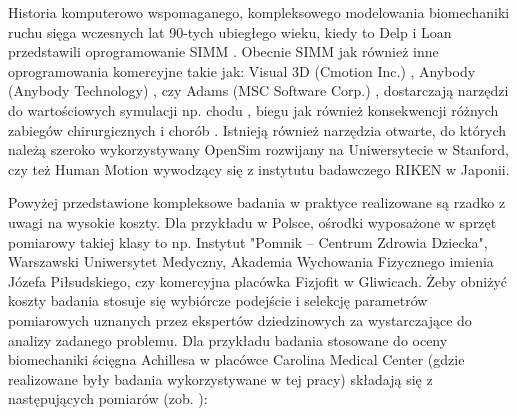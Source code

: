 Historia komputerowo wspomaganego, kompleksowego modelowania biomechaniki ruchu sięga wczesnych lat 90-tych ubiegłego wieku, kiedy to Delp i Loan przedstawili oprogramowanie SIMM \cite{Delp1990}. Obecnie SIMM jak również inne oprogramowania komercyjne takie jak: Visual 3D (Cmotion Inc.) \cite{Visual3D}, Anybody (Anybody Technology) \cite{AnyBody}, czy Adams (MSC Software Corp.) \cite{Adams}, dostarczają narzędzi do wartościowych symulacji np. chodu \cite{Steele2010}, biegu \cite{Hamner2010} jak również konsekwencji różnych zabiegów chirurgicznych \cite{Gomes2013} i chorób \cite{Shao2009}. Istnieją również narzędzia otwarte, do których należą szeroko wykorzystywany OpenSim \cite{Delp2007} rozwijany na Uniwersytecie w Stanford, czy też Human Motion \cite{Riken} wywodzący się z instytutu badawczego RIKEN w Japonii.

Powyżej przedstawione kompleksowe badania w praktyce realizowane są rzadko z uwagi na wysokie koszty. Dla przykładu w Polsce, ośrodki wyposażone w sprzęt pomiarowy takiej klasy to np. Instytut "Pomnik – Centrum Zdrowia Dziecka", Warszawski Uniwersytet Medyczny, Akademia Wychowania Fizycznego imienia Józefa Piłsudskiego, czy komercyjna placówka Fizjofit w Gliwicach. Żeby obniżyć koszty badania stosuje się wybiórcze podejście i selekcję parametrów pomiarowych uznanych przez ekspertów dziedzinowych za wystarczające do analizy zadanego problemu. Dla przykładu badania stosowane do oceny biomechaniki ścięgna Achillesa w placówce Carolina Medical Center (gdzie realizowane były badania wykorzystywane w tej pracy) składają się z następujących pomiarów (zob. \cite{CMC}):

